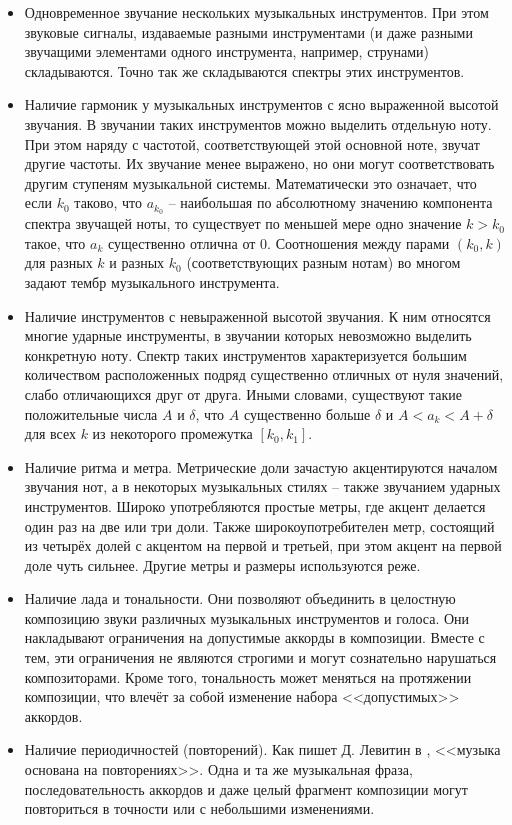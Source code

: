 \begin{itemize}
  \item Одновременное звучание нескольких музыкальных инструментов. При этом
  звуковые сигналы, издаваемые разными инструментами (и даже разными звучащими
  элементами одного инструмента, например, струнами) складываются. Точно так же
  складываются спектры этих инструментов.
  
  \item Наличие гармоник у музыкальных инструментов с ясно выраженной высотой
  звучания. В звучании таких инструментов можно выделить отдельную ноту. При
  этом наряду с частотой, соответствующей этой основной ноте, звучат другие
  частоты. Их звучание менее выражено, но они могут соответствовать другим
  ступеням музыкальной системы. Математически это означает, что если $k_0$
  таково, что $a_{k_0}$ -- наибольшая по абсолютному значению компонента спектра
  звучащей ноты, то существует по меньшей мере одно значение $k > k_0$ такое,
  что $a_k$ существенно отлична от 0. Соотношения между парами $(k_0, k)$ для
  разных $k$ и разных $k_0$ (соответствующих разным нотам) во многом задают
  тембр музыкального инструмента.
  
  \item Наличие инструментов с невыраженной высотой звучания. К ним относятся
  многие ударные инструменты, в звучании которых невозможно выделить конкретную
  ноту. Спектр таких инструментов характеризуется большим количеством
  расположенных подряд существенно отличных от нуля значений, слабо отличающихся
  друг от друга. Иными словами, существуют такие положительные числа $A$ и
  $\delta$, что $A$ существенно больше $\delta$ и $A < a_k < A + \delta$ для
  всех $k$ из некоторого промежутка $[k_0, k_1]$.
  
  \item Наличие ритма и метра. Метрические доли зачастую акцентируются началом
  звучания нот, а в некоторых музыкальных стилях -- также звучанием ударных
  инструментов. Широко употребляются простые метры, где акцент делается один раз
  на две или три доли. Также широкоупотребителен метр, состоящий из четырёх
  долей с акцентом на первой и третьей, при этом акцент на первой доле чуть
  сильнее. Другие метры и размеры используются реже.
  
  \item Наличие лада и тональности. Они позволяют объединить в целостную
  композицию звуки различных музыкальных инструментов и голоса. Они накладывают
  ограничения на допустимые аккорды в композиции. Вместе с тем, эти ограничения
  не являются строгими и могут сознательно нарушаться композиторами. Кроме того,
  тональность может меняться на протяжении композиции, что влечёт за собой
  изменение набора <<допустимых>> аккордов.
  
  \item Наличие периодичностей (повторений). Как пишет Д. Левитин в  
  \cite{Levitin2006}, <<музыка основана на повторениях>>. Одна и та же
  музыкальная фраза, последовательность аккордов и даже целый фрагмент
  композиции могут повториться в точности или с небольшими изменениями.
\end{itemize}

